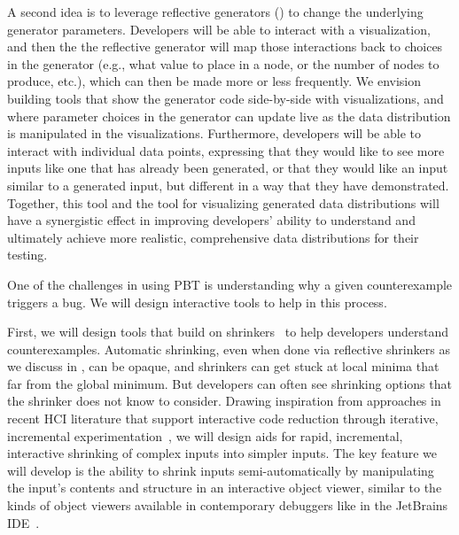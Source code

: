 A second idea is to leverage
reflective generators () to change the underlying
generator parameters. Developers will be able to interact with a visualization,
and then the the reflective generator will map those interactions
back to choices
in the generator (e.g., what value to place in a node, or the number of nodes to
produce, etc.), which can then be made more or less frequently. We envision
building tools that show the generator code
side-by-side with visualizations, and where parameter choices in the generator
can update live as the data distribution is manipulated in the visualizations.
Furthermore, developers will be able to interact with individual data points,
expressing that they would like to see more inputs like one that has already
been generated, or that they would like an input similar to a generated input,
but different in a way that they have demonstrated. Together, this tool and the
tool for visualizing generated data distributions will have a synergistic effect
in improving developers' ability to understand and ultimately achieve more
realistic, comprehensive data distributions for their testing.


%
One of the challenges in using PBT is understanding why
a given counterexample triggers a bug.  We will design interactive
tools to help in this process.

First, we will design tools that build on
shrinkers~\cite{hughes_quickcheck_2007,arts_shrinking_2014} to help developers
understand counterexamples. Automatic shrinking, even when done via reflective
shrinkers as we discuss in , can be opaque, and
shrinkers can get stuck at local minima that far from the global minimum.
But developers can often see shrinking options that the shrinker does not know to consider.
Drawing inspiration from approaches in recent HCI literature that support
interactive code reduction through iterative, incremental
experimentation~\cite{ref:lim2018ply,ref:head2018interactive,ref:holmes2012systematizing,ref:hibschman2016telescope},
we will design aids for rapid, incremental, interactive shrinking of complex
inputs into simpler inputs. The key feature we will develop is the ability to
shrink inputs semi-automatically by manipulating the input's contents and structure in an interactive
object viewer, similar to the kinds of object viewers available in contemporary
debuggers like in the JetBrains IDE~\cite{tool:jetbrains}.

